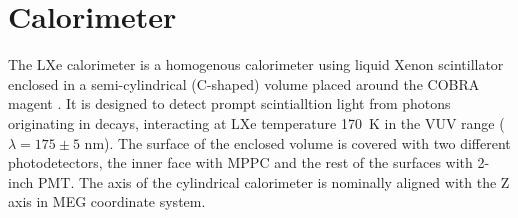 \section{Calorimeter}\label{sec:calorimeter}

The LXe calorimeter is a homogenous calorimeter using liquid Xenon scintillator
enclosed in a semi-cylindrical (C-shaped) volume placed around the COBRA magent
\cite{megdesign}.  It is designed to detect prompt scintialltion light from
photons originating in \muon decays, interacting at LXe temperature 170~K in the
VUV range ($\lambda = 175 \pm 5$ nm).  The surface of the enclosed volume is
covered with two different photodetectors, the inner face  with MPPC and the
rest of the surfaces with 2-inch PMT.  The axis of the cylindrical calorimeter
is nominally aligned with the Z axis in MEG coordinate system.

